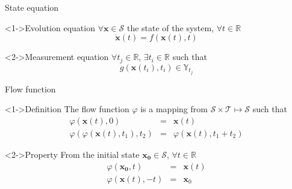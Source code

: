 \documentclass{beamer}
\begin{document}
            \begin{frame}{State equation}
                \begin{block}<1->{Evolution equation}
                    $\forall \mathbf{x} \in \mathcal{S}$ the state of the system, $\forall t \in \mathbb{R}$
                    \begin{equation}
                        \dot{\mathbf{x}}(t) = f(\mathbf{x}(t), t)
                    \end{equation}
                \end{block}

                \begin{block}<2->{Measurement equation}
                    $\forall t_j \in \mathbb{R}$, $\exists t_i \in \mathbb{R}$ such that
                    \begin{equation}
                        g(\mathbf{x}(t_i), t_i) \in \mathbb{Y}_{t_j}
                    \end{equation}
                \end{block}
            \end{frame}

            \begin{frame}{Flow function}
                \begin{block}<1->{Definition}
                    The flow function $\varphi$ is a mapping from $\mathcal{S} \times \mathcal{T} \mapsto \mathcal{S}$ such that
                    \begin{eqnarray}
                        \varphi(\mathbf{x}(t),0) &=& \mathbf{x}(t) \\
                        \varphi(\varphi(\mathbf{x}(t),t_1),t_2) &=& \varphi(\mathbf{x}(t),t_1+t_2)
                    \end{eqnarray}
                \end{block}
                \begin{block}<2->{Property}
                    From the initial state $\mathbf{x_0} \in \mathcal{S}$, $\forall t \in \mathbb{R}$
                    \begin{eqnarray}
                        \varphi(\mathbf{x_0},t) &=& \mathbf{x}(t) \\
                        \varphi(\mathbf{x}(t),-t) &=& \mathbf{x}_0
                    \end{eqnarray}
                \end{block}
            \end{frame}
\end{document}

